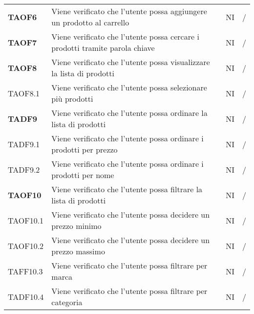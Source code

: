 \begin{center}
\begin{longtable}[!h]{p{60px} p{240px} p{35px} p{35px}}
        \textbf{TAOF6}  & Viene verificato che l'utente possa aggiungere un prodotto al carrello                                              & NI              & /              \\
        \textbf{TAOF7}  & Viene verificato che l'utente possa cercare i prodotti tramite parola chiave                                        & NI              & /              \\
        \textbf{TAOF8}  & Viene verificato che l'utente possa visualizzare la lista di prodotti                                               & NI              & /              \\
        TAOF8.1         & Viene verificato che l'utente possa selezionare più prodotti                                                        & NI              & /              \\
        \textbf{TADF9}  & Viene verificato che l'utente possa ordinare la lista di prodotti                                                   & NI             & /              \\
        TADF9.1         & Viene verificato che l'utente possa ordinare i prodotti per prezzo                                                  & NI             & /              \\
        TADF9.2         & Viene verificato che l'utente possa ordinare i prodotti per nome                                                    & NI             & /              \\
        \textbf{TAOF10} & Viene verificato che l'utente possa filtrare la lista di prodotti                                                   & NI              & /              \\
        TAOF10.1        & Viene verificato che l'utente possa decidere un prezzo minimo                                                       & NI              & /              \\
        TAOF10.2        & Viene verificato che l'utente possa decidere un prezzo massimo                                                      & NI              & /              \\
        TAFF10.3        & Viene verificato che l'utente possa filtrare per marca                                                              & NI             & /              \\
        TADF10.4        & Viene verificato che l'utente possa filtrare per categoria                                                          & NI             & /              \\

\end{longtable}
\end{center}
